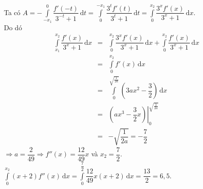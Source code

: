 \begin{ex}
{Ta có $A=-\displaystyle \int\limits_{-x_1}^0 \dfrac{f'\left( -t \right)}{{3^{-t}}+1}\mathrm{\,d}t
=\displaystyle \int\limits_0^{-x_1} \dfrac{3^tf'(t)}{3^t+1}\mathrm{\,d}t
=\displaystyle \int\limits_0^{x_2} \dfrac{3^xf'(x)}{3^x+1}\mathrm{\,d}x$.\\
Do dó
\allowdisplaybreaks
\begin{eqnarray*}
\displaystyle \int\limits_{x_1}^{x_2} \dfrac{f'(x)}{3^x+1}\mathrm{\,d}x
&=&\displaystyle \int\limits_0^{x_2} \dfrac{3^xf'(x)}{3^x+1}\mathrm{\,d}x +\displaystyle \int\limits_0^{x_2} \dfrac{f'(x)}{3^x+1}\mathrm{\,d}x\\
&=&\displaystyle \int\limits_0^{x_2} f'(x)\mathrm{\,d}x\\
&=&\displaystyle \int\limits_0^{\sqrt{\tfrac{1}{2a}}} \left( 3ax^2-\dfrac{3}{2} \right)\mathrm{\,d}x\\
&=&\left. \left( ax^3-\dfrac{3}{2}x \right) \right|_0^{\sqrt{\tfrac{1}{2a}}}\\
&=&-\sqrt{\dfrac{1}{2a}}=-\dfrac{7}{2}
\end{eqnarray*}
$\Rightarrow a=\dfrac{2}{49}
\Rightarrow f'' (x)=\dfrac{12}{49}x$ và $x_2=\dfrac{7}{2}$.
$\displaystyle \int\limits_0^{x_2} (x+2)f'' (x)\mathrm{\,d}x
=\displaystyle \int\limits_0^{\dfrac{7}{2}} \dfrac{12}{49}x(x+2)\mathrm{\,d}x=\dfrac{13}{2}=6{,}5$.\\
}
\end{ex}

